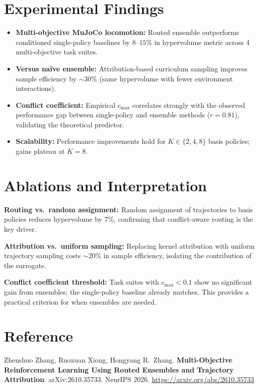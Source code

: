\documentclass[10pt,twocolumn]{article}
\begin{document}
\section{Experimental Findings}

\begin{itemize}[itemsep=2pt,parsep=0pt]
  \item \textbf{Multi-objective MuJoCo locomotion:} Routed ensemble
    outperforms conditioned single-policy baselines by $8$--$15\%$
    in hypervolume metric across 4 multi-objective task suites.
  \item \textbf{Versus na\"ive ensemble:} Attribution-based curriculum
    sampling improves sample efficiency by $\sim$30\% (same
    hypervolume with fewer environment interactions).
  \item \textbf{Conflict coefficient:} Empirical $c_{\max}$ correlates
    strongly with the observed performance gap between single-policy
    and ensemble methods ($r = 0.81$), validating the theoretical
    predictor.
  \item \textbf{Scalability:} Performance improvements hold for
    $K \in \{2, 4, 8\}$ basis policies; gains plateau at $K = 8$.
\end{itemize}

\section{Ablations and Interpretation}

\textbf{Routing vs.\ random assignment:}
Random assignment of trajectories to basis policies reduces hypervolume
by 7\%, confirming that conflict-aware routing is the key driver.

\textbf{Attribution vs.\ uniform sampling:}
Replacing kernel attribution with uniform trajectory sampling costs
$\sim$20\% in sample efficiency, isolating the contribution of the
surrogate.

\textbf{Conflict coefficient threshold:}
Task suites with $c_{\max} < 0.1$ show no significant gain from ensembles;
the single-policy baseline already matches. This provides a practical
criterion for when ensembles are needed.

\section*{Reference}

Zhenshuo Zhang, Ruoxuan Xiong, Hongyang R.\ Zhang.
\textbf{Multi-Objective Reinforcement Learning Using Routed Ensembles
and Trajectory Attribution}.
arXiv:2610.35733. NeurIPS 2026.
\url{https://arxiv.org/abs/2610.35733}
\end{document}
